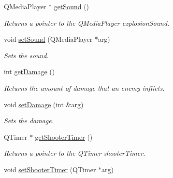 \begin{DoxyCompactItemize}
\mbox{\label{classEnemy_abda21c8dcacf52f59de732d56c7ac012}} 
Q\+Media\+Player $\ast$ \hyperlink{classEnemy_abda21c8dcacf52f59de732d56c7ac012}{get\+Sound} ()
\begin{DoxyCompactList}\small\item\em Returns a pointer to the Q\+Media\+Player explosion\+Sound. \end{DoxyCompactList}\item 
\mbox{\label{classEnemy_a656c43919f972077f20916577594e148}} 
void \hyperlink{classEnemy_a656c43919f972077f20916577594e148}{set\+Sound} (Q\+Media\+Player $\ast$arg)
\begin{DoxyCompactList}\small\item\em Sets the sound. \end{DoxyCompactList}\item 
\mbox{\label{classEnemy_a7d36994bba593bb623e943f9264f901b}} 
int \hyperlink{classEnemy_a7d36994bba593bb623e943f9264f901b}{get\+Damage} ()
\begin{DoxyCompactList}\small\item\em Returns the amount of damage that an enemy inflicts. \end{DoxyCompactList}\item 
\mbox{\label{classEnemy_ac66eb36302dfb355da9b5b397b165f56}} 
void \hyperlink{classEnemy_ac66eb36302dfb355da9b5b397b165f56}{set\+Damage} (int \&arg)
\begin{DoxyCompactList}\small\item\em Sets the damage. \end{DoxyCompactList}\item 
\mbox{\label{classEnemy_a826bba4cc09bc31cb2512891b797468a}} 
Q\+Timer $\ast$ \hyperlink{classEnemy_a826bba4cc09bc31cb2512891b797468a}{get\+Shooter\+Timer} ()
\begin{DoxyCompactList}\small\item\em Returns a pointer to the Q\+Timer shooter\+Timer. \end{DoxyCompactList}\item 
\mbox{\label{classEnemy_ac23a9c502aa5004cb211f0582e876867}} 
void \hyperlink{classEnemy_ac23a9c502aa5004cb211f0582e876867}{set\+Shooter\+Timer} (Q\+Timer $\ast$arg)

\end{DoxyCompactItemize}
